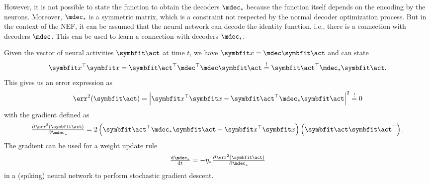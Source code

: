 However, it is not possible to state the function to obtain the decoders $\mdec_*$ because the function itself depends on the encoding by the neurons.
Moreover, $\mdec_*$ is a symmetric matrix, which is a constraint not respected by the normal decoder optimization process.
But in the context of the NEF, it can be assumed that the neural network can decode the identity function, i.e., there is a connection with decoders $\mdec$.
This can be used to learn a connection with decoders $\mdec_*$.

Given the vector of neural activities $\vc \act$ at time $t$, we have $\vc x = \mdec \vc \act$ and can state
\begin{equation}
    \vc x\Tr \vc x = \vc \act\Tr \mdec\Tr \mdec \vc\act \overset{!}{=} \vc\act\Tr\mdec_*\vc\act \text{.}
\end{equation}
This gives us an error expression as
\begin{equation}
    \err^2(\vc\act) = \left\lvert\vc x\Tr \vc x - \vc\act\Tr \mdec_* \vc\act\right\rvert^2 \overset{!}{=} 0
\end{equation}
with the gradient defined as
\begin{equation}
    \pd{\err^2(\vc\act)}{\mdec_*} = 2 \del{\vc\act\Tr \mdec_* \vc\act - \vc x\Tr \vc x} \del{\vc\act \vc\act\Tr} \text{.}
\end{equation}
The gradient can be used for a weight update rule
\begin{equation}
    \od{\mdec_*}{t} = -\eta_* \pd{\err^2(\vc\act)}{\mdec_*}
\end{equation}
in a (spiking) neural network to perform stochastic gradient descent.


